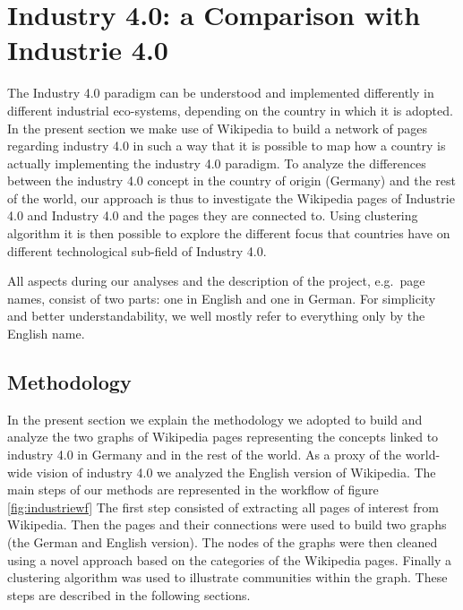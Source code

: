 \documentclass[]{book}
\theoremstyle{definition}
\theoremstyle{definition}
\theoremstyle{definition}
\theoremstyle{remark}
\begin{document}
\section{Industry 4.0: a Comparison with Industrie
4.0}\label{industry-4.0-a-comparison-with-industrie-4.0}

The Industry 4.0 paradigm can be understood and implemented differently
in different industrial eco-systems, depending on the country in which
it is adopted. In the present section we make use of Wikipedia to build
a network of pages regarding industry 4.0 in such a way that it is
possible to map how a country is actually implementing the industry 4.0
paradigm. To analyze the differences between the industry 4.0 concept in
the country of origin (Germany) and the rest of the world, our approach
is thus to investigate the Wikipedia pages of Industrie 4.0 and Industry
4.0 and the pages they are connected to. Using clustering algorithm it
is then possible to explore the different focus that countries have on
different technological sub-field of Industry 4.0.

All aspects during our analyses and the description of the project,
e.g.~page names, consist of two parts: one in English and one in German.
For simplicity and better understandability, we well mostly refer to
everything only by the English name.

\subsection{Methodology}\label{methodology-7}

In the present section we explain the methodology we adopted to build
and analyze the two graphs of Wikipedia pages representing the concepts
linked to industry 4.0 in Germany and in the rest of the world. As a
proxy of the world-wide vision of industry 4.0 we analyzed the English
version of Wikipedia. The main steps of our methods are represented in
the workflow of figure \ref{fig:industriewf} The first step consisted of
extracting all pages of interest from Wikipedia. Then the pages and
their connections were used to build two graphs (the German and English
version). The nodes of the graphs were then cleaned using a novel
approach based on the categories of the Wikipedia pages. Finally a
clustering algorithm was used to illustrate communities within the
graph. These steps are described in the following sections.
\end{document}
